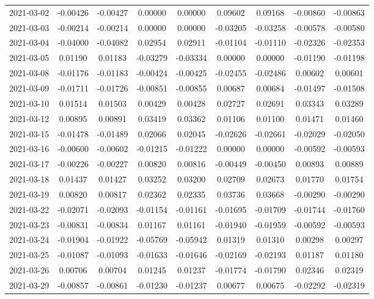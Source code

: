 \begin{footnotesize}
\begin{longtable}{lcccccccc}
2021-03-02 & -0.00426 & -0.00427 & 0.00000 & 0.00000 & 0.09602 & 0.09168 & -0.00860 & -0.00863 \\
2021-03-03 & -0.00214 & -0.00214 & 0.00000 & 0.00000 & -0.03205 & -0.03258 & -0.00578 & -0.00580 \\
2021-03-04 & -0.04000 & -0.04082 & 0.02954 & 0.02911 & -0.01104 & -0.01110 & -0.02326 & -0.02353 \\
2021-03-05 & 0.01190 & 0.01183 & -0.03279 & -0.03334 & 0.00000 & 0.00000 & -0.01190 & -0.01198 \\
2021-03-08 & -0.01176 & -0.01183 & -0.00424 & -0.00425 & -0.02455 & -0.02486 & 0.00602 & 0.00601 \\
2021-03-09 & -0.01711 & -0.01726 & -0.00851 & -0.00855 & 0.00687 & 0.00684 & -0.01497 & -0.01508 \\
2021-03-10 & 0.01514 & 0.01503 & 0.00429 & 0.00428 & 0.02727 & 0.02691 & 0.03343 & 0.03289 \\
2021-03-12 & 0.00895 & 0.00891 & 0.03419 & 0.03362 & 0.01106 & 0.01100 & 0.01471 & 0.01460 \\
2021-03-15 & -0.01478 & -0.01489 & 0.02066 & 0.02045 & -0.02626 & -0.02661 & -0.02029 & -0.02050 \\
2021-03-16 & -0.00600 & -0.00602 & -0.01215 & -0.01222 & 0.00000 & 0.00000 & -0.00592 & -0.00593 \\
2021-03-17 & -0.00226 & -0.00227 & 0.00820 & 0.00816 & -0.00449 & -0.00450 & 0.00893 & 0.00889 \\
2021-03-18 & 0.01437 & 0.01427 & 0.03252 & 0.03200 & 0.02709 & 0.02673 & 0.01770 & 0.01754 \\
2021-03-19 & 0.00820 & 0.00817 & 0.02362 & 0.02335 & 0.03736 & 0.03668 & -0.00290 & -0.00290 \\
2021-03-22 & -0.02071 & -0.02093 & -0.01154 & -0.01161 & -0.01695 & -0.01709 & -0.01744 & -0.01760 \\
2021-03-23 & -0.00831 & -0.00834 & 0.01167 & 0.01161 & -0.01940 & -0.01959 & -0.00592 & -0.00593 \\
2021-03-24 & -0.01904 & -0.01922 & -0.05769 & -0.05942 & 0.01319 & 0.01310 & 0.00298 & 0.00297 \\
2021-03-25 & -0.01087 & -0.01093 & -0.01633 & -0.01646 & -0.02169 & -0.02193 & 0.01187 & 0.01180 \\
2021-03-26 & 0.00706 & 0.00704 & 0.01245 & 0.01237 & -0.01774 & -0.01790 & 0.02346 & 0.02319 \\
2021-03-29 & -0.00857 & -0.00861 & -0.01230 & -0.01237 & 0.00677 & 0.00675 & -0.02292 & -0.02319 \\

\end{longtable}
\end{footnotesize}
